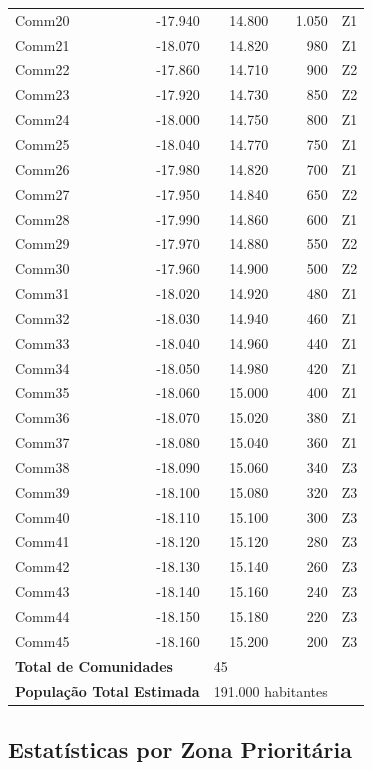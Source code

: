 \documentclass[12pt, a4paper]{article}
\begin{document}
\begin{table}[H]
\begin{tabular}{|l|r|r|r|r|}
Comm20 & -17.940 & 14.800 & 1.050 & Z1 \\
Comm21 & -18.070 & 14.820 & 980 & Z1 \\
Comm22 & -17.860 & 14.710 & 900 & Z2 \\
Comm23 & -17.920 & 14.730 & 850 & Z2 \\
Comm24 & -18.000 & 14.750 & 800 & Z1 \\
Comm25 & -18.040 & 14.770 & 750 & Z1 \\
Comm26 & -17.980 & 14.820 & 700 & Z1 \\
Comm27 & -17.950 & 14.840 & 650 & Z2 \\
Comm28 & -17.990 & 14.860 & 600 & Z1 \\
Comm29 & -17.970 & 14.880 & 550 & Z2 \\
Comm30 & -17.960 & 14.900 & 500 & Z2 \\
Comm31 & -18.020 & 14.920 & 480 & Z1 \\
Comm32 & -18.030 & 14.940 & 460 & Z1 \\
Comm33 & -18.040 & 14.960 & 440 & Z1 \\
Comm34 & -18.050 & 14.980 & 420 & Z1 \\
Comm35 & -18.060 & 15.000 & 400 & Z1 \\
Comm36 & -18.070 & 15.020 & 380 & Z1 \\
Comm37 & -18.080 & 15.040 & 360 & Z1 \\
Comm38 & -18.090 & 15.060 & 340 & Z3 \\
Comm39 & -18.100 & 15.080 & 320 & Z3 \\
Comm40 & -18.110 & 15.100 & 300 & Z3 \\
Comm41 & -18.120 & 15.120 & 280 & Z3 \\
Comm42 & -18.130 & 15.140 & 260 & Z3 \\
Comm43 & -18.140 & 15.160 & 240 & Z3 \\
Comm44 & -18.150 & 15.180 & 220 & Z3 \\
Comm45 & -18.160 & 15.200 & 200 & Z3 \\
\hline
\multicolumn{2}{|l|}{\textbf{Total de Comunidades}} & \multicolumn{2}{l|}{45} & \\
\multicolumn{2}{|l|}{\textbf{População Total Estimada}} & \multicolumn{2}{l|}{191.000 habitantes} & \\
\hline
\end{tabular}
\end{table}

\subsection{Estatísticas por Zona Prioritária}
\end{document}
